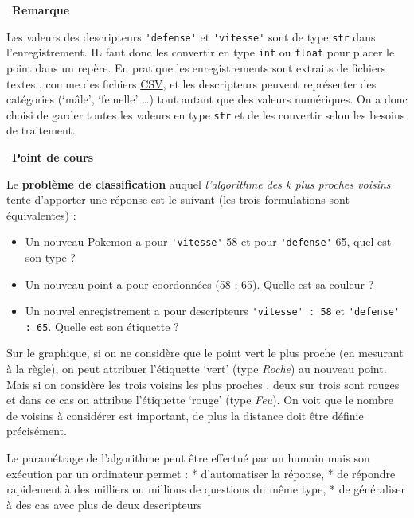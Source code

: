 \documentclass[
  11pt,
]{article}
\newcommand{\passthrough}[1]{#1}
\providecommand{\tightlist}{%
  \setlength{\itemsep}{0pt}\setlength{\parskip}{0pt}}
\newcounter{thme}
\newcounter{rque}
\newenvironment{remarque}
{\par \medskip    \addtocounter{rque}{1} \noindent  
\begin{bclogo}[arrondi =0.1,  ombre = true, barre=snake, noborder = true, logo=\bcinfo, marge=0]{~\textbf{Remarque} \textbf{\therque}}  \par }
{
\end{bclogo}
 \par \bigskip }
\newcounter{def}
\newcounter{cours}
\newenvironment{cours}[1]
{\par \medskip   \addtocounter{cours}{1} \noindent  
\begin{bclogo}[arrondi =0.1,  ombre = true, barre=none, logo=\bcbook, marge=4]{~\textbf{Point de cours} \textbf{\thecours} {\itshape #1} }  \par}
{
\end{bclogo}
 \par \bigskip }
\newcounter{alg}
\begin{document}
\begin{remarque}{}

Les valeurs des descripteurs \passthrough{\lstinline!'defense'!} et
\passthrough{\lstinline!'vitesse'!} sont de type
\passthrough{\lstinline!str!} dans l'enregistrement. IL faut donc les
convertir en type \passthrough{\lstinline!int!} ou
\passthrough{\lstinline!float!} pour placer le point dans un repère. En
pratique les enregistrements sont extraits de fichiers textes , comme
des fichiers
\href{https://fr.wikipedia.org/wiki/Comma-separated_values}{CSV}, et les
descripteurs peuvent représenter des catégories (`mâle', `femelle'
\ldots{}) tout autant que des valeurs numériques. On a donc choisi de
garder toutes les valeurs en type \passthrough{\lstinline!str!} et de
les convertir selon les besoins de traitement.

\end{remarque}

\begin{cours}{}

Le \textbf{problème de classification} auquel \emph{l'algorithme des k
plus proches voisins} tente d'apporter une réponse est le suivant (les
trois formulations sont équivalentes) :

\begin{itemize}
\tightlist
\item
  Un nouveau Pokemon a pour \passthrough{\lstinline!'vitesse'!} 58 et
  pour \passthrough{\lstinline!'defense'!} 65, quel est son type ?
\item
  Un nouveau point a pour coordonnées (58 ; 65). Quelle est sa couleur ?
\item
  Un nouvel enregistrement a pour descripteurs
  \passthrough{\lstinline!'vitesse' : 58!} et
  \passthrough{\lstinline!'defense' : 65!}. Quelle est son étiquette ?
\end{itemize}

Sur le graphique, si on ne considère que le point vert le plus proche
(en mesurant à la règle), on peut attribuer l'étiquette `vert' (type
\emph{Roche}) au nouveau point. Mais si on considère les trois voisins
les plus proches , deux sur trois sont rouges et dans ce cas on attribue
l'étiquette `rouge' (type \emph{Feu}). On voit que le nombre de voisins
à considérer est important, de plus la distance doit être définie
précisément.

Le paramétrage de l'algorithme peut être effectué par un humain mais son
exécution par un ordinateur permet : * d'automatiser la réponse, * de
répondre rapidement à des milliers ou millions de questions du même
type, * de généraliser à des cas avec plus de deux descripteurs

\end{cours}
\end{document}
